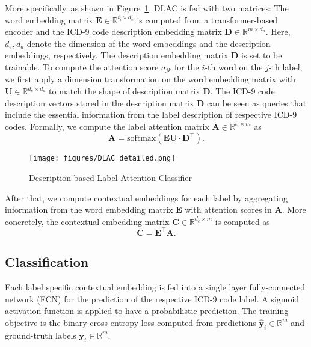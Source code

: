 \documentclass[11pt]{article}
\begin{document}
More specifically, as shown in Figure~\ref{fig:lac_detailed}, DLAC is fed with two matrices:
The word embedding matrix $\boldsymbol{E}\in\mathbb{R}^{t_{i}\times d_{e}}$ is computed from a transformer-based encoder and the ICD-9 code description embedding matrix $\boldsymbol{D}\in\mathbb{R}^{m\times d_{a}}$. Here, $d_{e}, d_{a}$ denote  the dimension of the word embeddings and the description embeddings, respectively. The description embedding matrix $\boldsymbol{D}$ is set to be trainable. To compute the attention score ${a}_{jk}$ for the $i$-th word on the $j$-th label, we first apply a dimension transformation on the word embedding matrix with  $\boldsymbol{U}\in\mathbb{R}^{d_{e}\times {d_{a}}}$ to match the shape of description matrix $\boldsymbol{D}$. The ICD-9 code description vectors stored in the description matrix $\boldsymbol{D}$ can be seen as queries that include the essential information from the label description of respective ICD-9 codes. Formally, we compute the label attention matrix $\boldsymbol{A}\in\mathbb{R}^{t_{i}\times m}$ as
\begin{equation*}
\boldsymbol{A}=\text{softmax}(\boldsymbol{E}\boldsymbol{U}\cdot \boldsymbol{D^{\top}}).
\end{equation*}

\begin{figure}[t]
\centering
\texttt{[image: figures/DLAC\_detailed.png]}
\caption{Description-based Label Attention Classifier}
\label{fig:lac_detailed}
\end{figure}
After that, we compute contextual embeddings for each label by aggregating information from the word embedding matrix $\boldsymbol{E}$ with attention scores in $\boldsymbol{A}$. More concretely, the contextual embedding matrix $\boldsymbol{C}\in\mathbb{R}^{d_e\times m}$ is computed as
\begin{equation*}
\boldsymbol{C}=\boldsymbol{E}^{\top}\boldsymbol{A}.
\end{equation*}
\subsection{Classification}
Each label specific contextual embedding is fed into a single layer fully-connected network (FCN) for the prediction of the respective ICD-9 code label. A sigmoid activation function is applied to have a probabilistic prediction. The training objective is the binary cross-entropy loss computed from predictions $\boldsymbol{\hat{y}}_i\in\mathbb{R}^{m}$ and ground-truth labels $\boldsymbol{y}_i\in\mathbb{R}^{m}$. 
\end{document}
